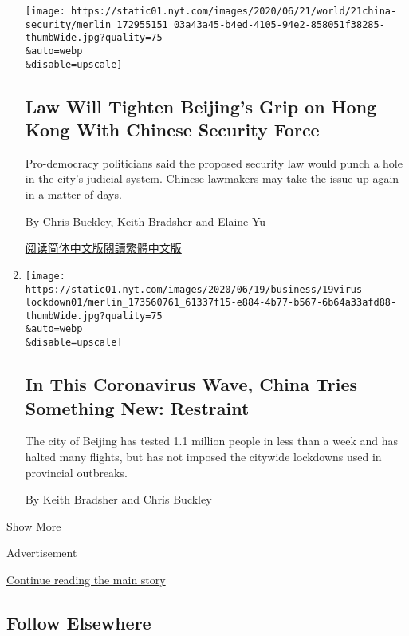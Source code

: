 \begin{enumerate}
  \texttt{[image: https://static01.nyt.com/images/2020/06/21/world/21china-security/merlin\_172955151\_03a43a45-b4ed-4105-94e2-858051f38285-thumbWide.jpg?quality=75\\\&auto=webp\\\&disable=upscale]}

  \hypertarget{law-will-tighten-beijings-grip-on-hong-kong-with-chinese-security-force}{%
  \subsection{Law Will Tighten Beijing's Grip on Hong Kong With Chinese
  Security
  Force}\label{law-will-tighten-beijings-grip-on-hong-kong-with-chinese-security-force}}

  Pro-democracy politicians said the proposed security law would punch a
  hole in the city's judicial system. Chinese lawmakers may take the
  issue up again in a matter of days.

  By Chris Buckley, Keith Bradsher and Elaine Yu

  \href{https://cn.nytimes.com/china/20200622/china-hong-kong-security-law/}{阅读简体中文版}\href{https://cn.nytimes.com/china/20200622/china-hong-kong-security-law/zh-hant/}{閱讀繁體中文版}
\item
  \href{/2020/06/19/world/asia/coronavirus-china-beijing.html}{}

  \texttt{[image: https://static01.nyt.com/images/2020/06/19/business/19virus-lockdown01/merlin\_173560761\_61337f15-e884-4b77-b567-6b64a33afd88-thumbWide.jpg?quality=75\\\&auto=webp\\\&disable=upscale]}

  \hypertarget{in-this-coronavirus-wave-china-tries-something-new-restraint}{%
  \subsection{In This Coronavirus Wave, China Tries Something New:
  Restraint}\label{in-this-coronavirus-wave-china-tries-something-new-restraint}}

  The city of Beijing has tested 1.1 million people in less than a week
  and has halted many flights, but has not imposed the citywide
  lockdowns used in provincial outbreaks.

  By Keith Bradsher and Chris Buckley
\end{enumerate}

Show More

Advertisement

\protect\hyperlink{after-mid2}{Continue reading the main story}

\hypertarget{follow-elsewhere}{%
\subsection{Follow Elsewhere}\label{follow-elsewhere}}


